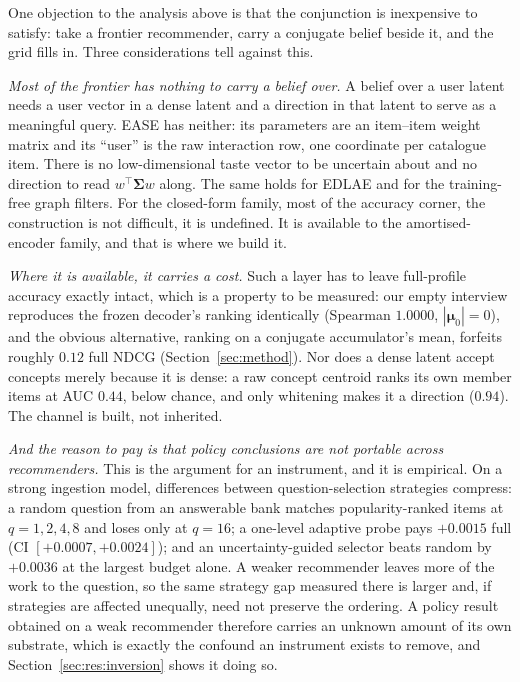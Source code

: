 \documentclass[acmsmall,review,anonymous]{acmart}
\newcommand{\bmu}{\boldsymbol{\mu}}
\newcommand{\bSigma}{\boldsymbol{\Sigma}}
\begin{document}
One objection to the analysis above is that the conjunction is inexpensive to satisfy: take a frontier recommender, carry a conjugate belief beside it, and the grid fills in. Three considerations tell against this.

\emph{Most of the frontier has nothing to carry a belief over.} A belief over a user latent needs a user vector in a dense latent and a direction in that latent to serve as a meaningful query. EASE has neither: its parameters are an item--item weight matrix and its ``user'' is the raw interaction row, one coordinate per catalogue item. There is no low-dimensional taste vector to be uncertain about and no direction to read $w^\top\bSigma w$ along. The same holds for EDLAE and for the training-free graph filters. For the closed-form family, most of the accuracy corner, the construction is not difficult, it is undefined. It is available to the amortised-encoder family, and that is where we build it.

\emph{Where it is available, it carries a cost.} Such a layer has to leave full-profile accuracy exactly intact, which is a property to be measured: our empty interview reproduces the frozen decoder's ranking identically (Spearman $1.0000$, $|\bmu_0|=0$), and the obvious alternative, ranking on a conjugate accumulator's mean, forfeits roughly $0.12$ full NDCG (Section~\ref{sec:method}). Nor does a dense latent accept concepts merely because it is dense: a raw concept centroid ranks its own member items at AUC $0.44$, below chance, and only whitening makes it a direction ($0.94$). The channel is built, not inherited.

\emph{And the reason to pay is that policy conclusions are not portable across recommenders.} This is the argument for an instrument, and it is empirical. On a strong ingestion model, differences between question-selection strategies compress: a random question from an answerable bank matches popularity-ranked items at $q{=}1,2,4,8$ and loses only at $q{=}16$; a one-level adaptive probe pays $+0.0015$ full (CI $[+0.0007,+0.0024]$); and an uncertainty-guided selector beats random by $+0.0036$ at the largest budget alone. A weaker recommender leaves more of the work to the question, so the same strategy gap measured there is larger and, if strategies are affected unequally, need not preserve the ordering. A policy result obtained on a weak recommender therefore carries an unknown amount of its own substrate, which is exactly the confound an instrument exists to remove, and Section~\ref{sec:res:inversion} shows it doing so.
\end{document}
